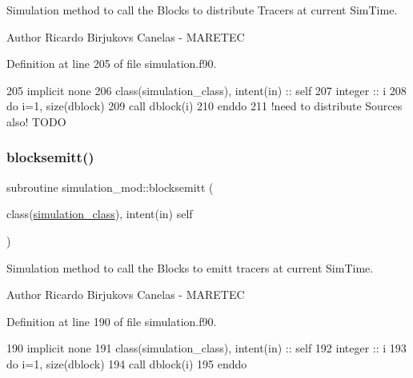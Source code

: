 Simulation method to call the Blocks to distribute Tracers at current Sim\+Time. 

\begin{DoxyAuthor}{Author}
Ricardo Birjukovs Canelas -\/ M\+A\+R\+E\+T\+EC 
\end{DoxyAuthor}


Definition at line 205 of file simulation.\+f90.


\begin{DoxyCode}
205     \textcolor{keywordtype}{implicit none}
206     \textcolor{keywordtype}{class}(simulation\_class), \textcolor{keywordtype}{intent(in)} :: self
207     \textcolor{keywordtype}{integer} :: i
208     \textcolor{keywordflow}{do} i=1, \textcolor{keyword}{size}(dblock)
209         \textcolor{keyword}{call }dblock(i)%
210 \textcolor{keywordflow}{    enddo}
211     \textcolor{comment}{!need to distribute Sources also! TODO}
\end{DoxyCode}
\mbox{\label{namespacesimulation__mod_a13aa0745f4601e3f418143dab2f18276}} 
\subsubsection{\texorpdfstring{blocksemitt()}{blocksemitt()}}
{\footnotesize\ttfamily subroutine simulation\+\_\+mod\+::blocksemitt (\begin{DoxyParamCaption}\item[{class(\mbox{\hyperlink{structsimulation__mod_1_1simulation__class}{simulation\+\_\+class}}), intent(in)}]{self }\end{DoxyParamCaption})\hspace{0.3cm}{\ttfamily [private]}}



Simulation method to call the Blocks to emitt tracers at current Sim\+Time. 

\begin{DoxyAuthor}{Author}
Ricardo Birjukovs Canelas -\/ M\+A\+R\+E\+T\+EC 
\end{DoxyAuthor}


Definition at line 190 of file simulation.\+f90.


\begin{DoxyCode}
190     \textcolor{keywordtype}{implicit none}
191     \textcolor{keywordtype}{class}(simulation\_class), \textcolor{keywordtype}{intent(in)} :: self
192     \textcolor{keywordtype}{integer} :: i
193     \textcolor{keywordflow}{do} i=1, \textcolor{keyword}{size}(dblock)
194         \textcolor{keyword}{call }dblock(i)%
195 \textcolor{keywordflow}{    enddo}
\end{DoxyCode}
\mbox{\label{namespacesimulation__mod_a624d5b402a8d359219839841862ab307}} 
